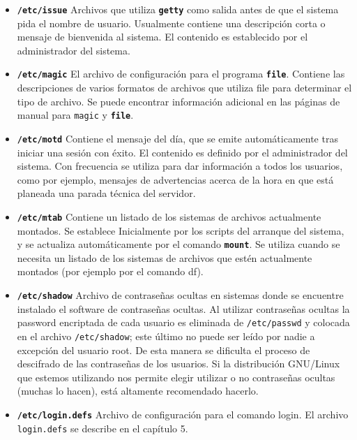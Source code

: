 \documentclass[12pt]{article}
\begin{document}
\begin{itemize}
	\item \textbf{\texttt{/etc/issue}}
	 Archivos que utiliza \texttt{\textbf{getty}} como
	salida antes de que el sistema pida el nombre de usuario. Usualmente
	contiene una descripción corta o mensaje de bienvenida al sistema.  El
	contenido es establecido por el administrador del sistema.
	


	\item \textbf{\texttt{/etc/magic}}
	 El archivo de configuración para el programa
	\texttt{\textbf{file}}. Contiene las descripciones de varios formatos
	de archivos que utiliza file para determinar el tipo de archivo. Se
	puede encontrar información adicional en las páginas de manual
	para \texttt{magic} y \texttt{\textbf{file}}.
	


	\item \textbf{\texttt{/etc/motd}}
	 Contiene el mensaje del día, que se emite
	automáticamente  		tras iniciar una sesión con éxito. El
	contenido 	es definido por el 		administrador del
	sistema. Con frecuencia se utiliza para dar información a 	todos
	los usuarios, como por ejemplo, mensajes de advertencias acerca de la
	hora en que está planeada una parada técnica del servidor.
	


	\item \textbf{\texttt{/etc/mtab}}
	 Contiene un listado de los sistemas de archivos
	actualmente montados. Se establece Inicialmente por los scripts del
	arranque del sistema, y se actualiza automáticamente por el comando
	\texttt{\textbf{mount}}. Se utiliza cuando se necesita un listado de
	los sistemas de archivos que estén actualmente montados (por ejemplo por
	el comando df).  


	\item \textbf{\texttt{/etc/shadow}}
	 Archivo de contraseñas ocultas en sistemas donde se
	encuentre instalado el software de contraseñas ocultas.  Al utilizar
	contraseñas ocultas la password encriptada de cada usuario es eliminada
	de \texttt{/etc/passwd} y colocada en el archivo
	\texttt{/etc/shadow}; este último no 		puede
	ser leído por nadie a excepción del usuario root. De esta manera se
	dificulta el proceso de descifrado de las contraseñas de los usuarios.
	Si 		la distribución GNU/Linux que estemos utilizando nos
	permite elegir 			utilizar o no contraseñas ocultas
	(muchas lo hacen), está altamente 			recomendado
	hacerlo.  


	\item \textbf{\texttt{/etc/login.defs}}
	 Archivo de configuración para el comando login.  El
	archivo \texttt{login.defs} se describe en el capítulo 5.
	


\end{itemize}
\end{document}
